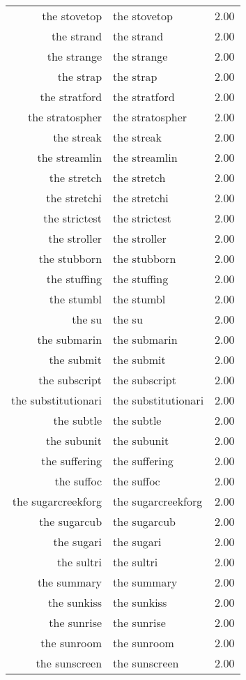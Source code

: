 \begin{table}[ht]
\begin{tabular}{rlr}
  the stovetop & the stovetop & 2.00 \\ 
  the strand & the strand & 2.00 \\ 
  the strange & the strange & 2.00 \\ 
  the strap & the strap & 2.00 \\ 
  the stratford & the stratford & 2.00 \\ 
  the stratospher & the stratospher & 2.00 \\ 
  the streak & the streak & 2.00 \\ 
  the streamlin & the streamlin & 2.00 \\ 
  the stretch & the stretch & 2.00 \\ 
  the stretchi & the stretchi & 2.00 \\ 
  the strictest & the strictest & 2.00 \\ 
  the stroller & the stroller & 2.00 \\ 
  the stubborn & the stubborn & 2.00 \\ 
  the stuffing & the stuffing & 2.00 \\ 
  the stumbl & the stumbl & 2.00 \\ 
  the su & the su & 2.00 \\ 
  the submarin & the submarin & 2.00 \\ 
  the submit & the submit & 2.00 \\ 
  the subscript & the subscript & 2.00 \\ 
  the substitutionari & the substitutionari & 2.00 \\ 
  the subtle & the subtle & 2.00 \\ 
  the subunit & the subunit & 2.00 \\ 
  the suffering & the suffering & 2.00 \\ 
  the suffoc & the suffoc & 2.00 \\ 
  the sugarcreekforg & the sugarcreekforg & 2.00 \\ 
  the sugarcub & the sugarcub & 2.00 \\ 
  the sugari & the sugari & 2.00 \\ 
  the sultri & the sultri & 2.00 \\ 
  the summary & the summary & 2.00 \\ 
  the sunkiss & the sunkiss & 2.00 \\ 
  the sunrise & the sunrise & 2.00 \\ 
  the sunroom & the sunroom & 2.00 \\ 
  the sunscreen & the sunscreen & 2.00 \\ 

\end{tabular}
\end{table}
